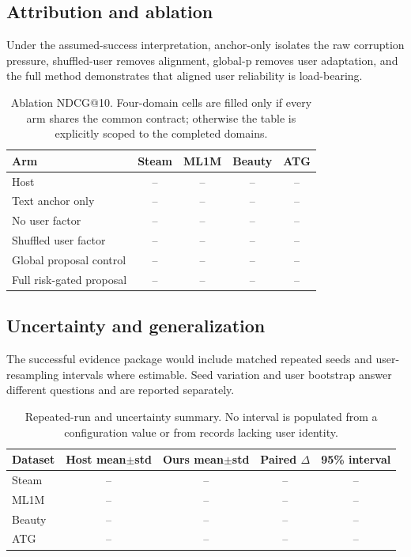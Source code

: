 \documentclass[letterpaper]{article}
\newcommand{\blankcell}{--}
\begin{document}
\subsection{Attribution and ablation}
Under the assumed-success interpretation, anchor-only isolates the raw corruption pressure, shuffled-user removes alignment, global-p removes user adaptation, and the full method demonstrates that aligned user reliability is load-bearing.

\begin{table}[t]
\centering\small
\begin{tabular}{lcccc}
\toprule
Arm & Steam & ML1M & Beauty & ATG\\
\midrule
Host & \blankcell&\blankcell&\blankcell&\blankcell\\
Text anchor only & \blankcell&\blankcell&\blankcell&\blankcell\\
No user factor & \blankcell&\blankcell&\blankcell&\blankcell\\
Shuffled user factor & \blankcell&\blankcell&\blankcell&\blankcell\\
Global proposal control & \blankcell&\blankcell&\blankcell&\blankcell\\
Full risk-gated proposal & \blankcell&\blankcell&\blankcell&\blankcell\\
\bottomrule
\end{tabular}
\caption{Ablation NDCG@10. Four-domain cells are filled only if every arm shares the common contract; otherwise the table is explicitly scoped to the completed domains.}
\end{table}

\subsection{Uncertainty and generalization}
The successful evidence package would include matched repeated seeds and user-resampling intervals where estimable. Seed variation and user bootstrap answer different questions and are reported separately.

\begin{table}[t]
\centering\small
\begin{tabular}{lcccc}
\toprule
Dataset & Host mean$\pm$std & Ours mean$\pm$std & Paired $\Delta$ & 95\% interval\\
\midrule
Steam & \blankcell&\blankcell&\blankcell&\blankcell\\
ML1M & \blankcell&\blankcell&\blankcell&\blankcell\\
Beauty & \blankcell&\blankcell&\blankcell&\blankcell\\
ATG & \blankcell&\blankcell&\blankcell&\blankcell\\
\bottomrule
\end{tabular}
\caption{Repeated-run and uncertainty summary. No interval is populated from a configuration value or from records lacking user identity.}
\end{table}
\end{document}
